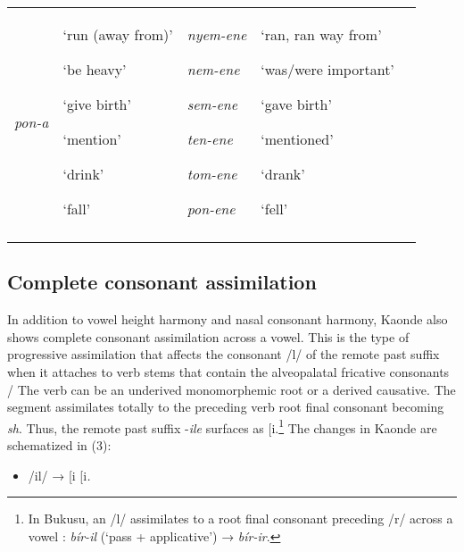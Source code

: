 \documentclass[output=paper]{langsci/langscibook}
\begin{document}
\begin{tabularx}{\textwidth}{XXXXX}
\emph{pon-a} & {‘run (away from)’}

{‘be heavy’}

{‘give birth’}

{‘mention’}

{‘drink’}

‘fall’ & {\emph{nyem-ene}}

{\emph{nem-ene}}

{\emph{sem-ene}}

{\emph{ten-ene  }}

{\emph{tom-ene }}

\emph{pon-ene} & {‘ran, ran way from’}

{‘was/were important’}

{‘gave birth’}

{‘mentioned’}

{‘drank’}

‘fell’\\
\lspbottomrule
\end{tabularx}
\subsection{Complete consonant assimilation}

In addition to vowel height harmony and nasal consonant harmony, Kaonde also shows complete consonant assimilation across a vowel. This is the type of progressive assimilation that affects the consonant /l/ of the remote past suffix when it attaches to verb stems that contain the alveopalatal fricative consonants / The verb can be an underived monomorphemic root or a derived causative. The segment assimilates totally to the preceding verb root final consonant becoming \textit{sh}. Thus, the remote past suffix -\emph{ile}\textit{ }surfaces as [i\textstyleipa{ʃe],}.\footnote{ In Bukusu, an /l/ assimilates to a root final consonant preceding /r/ across a vowel \citep{Hyman2003}: \textit{bír-il} (‘pass + applicative’) → \textit{bír-ir}.} The changes in Kaonde are schematized in (3):

\begin{itemize}
\item \begin{stylelsLanginfo}
/il/ → [i\textstyleipa{ʃ],} [i\textstyleipa{ʒ] after verb stems ending in }\textstyleipa{\textit{ }}\textit{.}
\end{stylelsLanginfo}\end{itemize}
\end{document}
